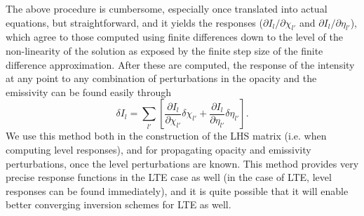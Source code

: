 \documentclass{aa}
\begin{document}
The above procedure is cumbersome, especially once translated into actual equations, but straightforward, and it yields the responses ($\partial I_{l}/\partial \chi_{l'}$ and $\partial I_{l}/\partial \eta_{l'}$), which agree to those computed using finite differences down to the level of the non-linearity of the solution as exposed by the finite step size of the finite difference approximation. After these are computed, the response of the intensity at any point to any combination of perturbations in the opacity and the emissivity can be found easily through
\begin{equation}
 \delta I_l = \sum_{l'} \left [ \frac{\partial I_l}{\partial \chi_{l'}} \delta \chi_{l'} + \frac{\partial I_l}{\partial \eta_{l'}} \delta \eta_{l'} \right ].
\end{equation}
We use this method both in the construction of the LHS matrix (i.e. when computing level responses), and for propagating opacity and emissivity perturbations, once the level perturbations are known. This method provides very precise response functions in the LTE case as well (in the case of LTE, level responses can be found immediately), and it is quite possible that it will enable better converging inversion schemes for LTE as well.


\end{document}
